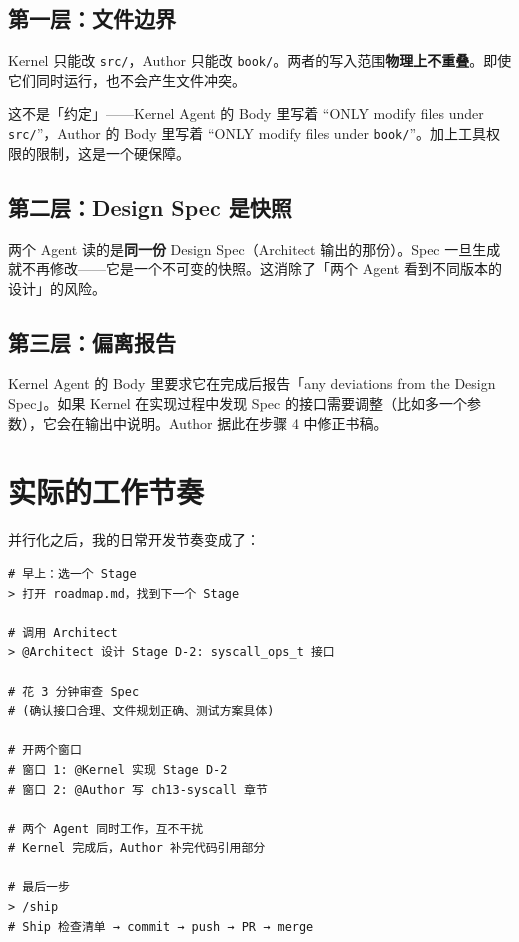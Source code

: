 \subsection{第一层：文件边界}

Kernel 只能改 \texttt{src/}，Author 只能改 \texttt{book/}。两者的写入范围\textbf{物理上不重叠}。即使它们同时运行，也不会产生文件冲突。

这不是「约定」——Kernel Agent 的 Body 里写着 ``ONLY modify files under \texttt{src/}''，Author 的 Body 里写着 ``ONLY modify files under \texttt{book/}''。加上工具权限的限制，这是一个硬保障。

\subsection{第二层：Design Spec 是快照}

两个 Agent 读的是\textbf{同一份} Design Spec（Architect 输出的那份）。Spec 一旦生成就不再修改——它是一个不可变的快照。这消除了「两个 Agent 看到不同版本的设计」的风险。

\subsection{第三层：偏离报告}

Kernel Agent 的 Body 里要求它在完成后报告「any deviations from the Design Spec」。如果 Kernel 在实现过程中发现 Spec 的接口需要调整（比如多一个参数），它会在输出中说明。Author 据此在步骤 4 中修正书稿。

\section{实际的工作节奏}

并行化之后，我的日常开发节奏变成了：

\begin{lstlisting}[style=shellstyle]
# 早上：选一个 Stage
> 打开 roadmap.md，找到下一个 Stage

# 调用 Architect
> @Architect 设计 Stage D-2: syscall_ops_t 接口

# 花 3 分钟审查 Spec
# (确认接口合理、文件规划正确、测试方案具体)

# 开两个窗口
# 窗口 1: @Kernel 实现 Stage D-2
# 窗口 2: @Author 写 ch13-syscall 章节

# 两个 Agent 同时工作，互不干扰
# Kernel 完成后，Author 补完代码引用部分

# 最后一步
> /ship
# Ship 检查清单 → commit → push → PR → merge
\end{lstlisting}

